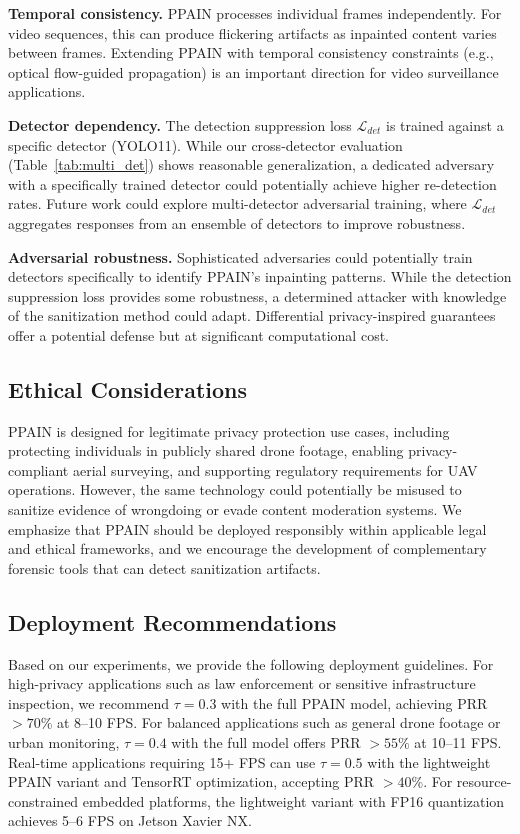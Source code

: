 \documentclass[preprint,12pt]{elsarticle}
\begin{document}
\textbf{Temporal consistency.} PPAIN processes individual frames independently. For video sequences, this can produce flickering artifacts as inpainted content varies between frames. Extending PPAIN with temporal consistency constraints (e.g., optical flow-guided propagation) is an important direction for video surveillance applications.

\textbf{Detector dependency.} The detection suppression loss $\mathcal{L}_{det}$ is trained against a specific detector (YOLO11). While our cross-detector evaluation (Table~\ref{tab:multi_det}) shows reasonable generalization, a dedicated adversary with a specifically trained detector could potentially achieve higher re-detection rates. Future work could explore multi-detector adversarial training, where $\mathcal{L}_{det}$ aggregates responses from an ensemble of detectors to improve robustness.

\textbf{Adversarial robustness.} Sophisticated adversaries could potentially train detectors specifically to identify PPAIN's inpainting patterns. While the detection suppression loss provides some robustness, a determined attacker with knowledge of the sanitization method could adapt. Differential privacy-inspired guarantees~\cite{ryoo2017privacy} offer a potential defense but at significant computational cost.

\subsection{Ethical Considerations}

PPAIN is designed for legitimate privacy protection use cases, including protecting individuals in publicly shared drone footage, enabling privacy-compliant aerial surveying, and supporting regulatory requirements for UAV operations. However, the same technology could potentially be misused to sanitize evidence of wrongdoing or evade content moderation systems. We emphasize that PPAIN should be deployed responsibly within applicable legal and ethical frameworks, and we encourage the development of complementary forensic tools that can detect sanitization artifacts.

\subsection{Deployment Recommendations}

Based on our experiments, we provide the following deployment guidelines. For high-privacy applications such as law enforcement or sensitive infrastructure inspection, we recommend $\tau = 0.3$ with the full PPAIN model, achieving PRR $> 70\%$ at 8--10 FPS. For balanced applications such as general drone footage or urban monitoring, $\tau = 0.4$ with the full model offers PRR $> 55\%$ at 10--11 FPS. Real-time applications requiring 15+ FPS can use $\tau = 0.5$ with the lightweight PPAIN variant and TensorRT optimization, accepting PRR $> 40\%$. For resource-constrained embedded platforms, the lightweight variant with FP16 quantization achieves 5--6 FPS on Jetson Xavier NX.
\end{document}

